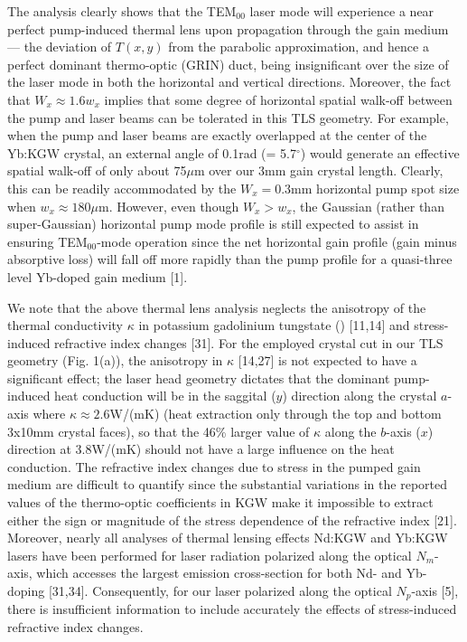
The analysis clearly shows that the TEM$_{00}$ laser mode will experience a near perfect pump-induced thermal lens upon propagation through the gain medium --- the deviation of $T(x,y)$ from the parabolic approximation, and hence a perfect dominant thermo-optic (GRIN) duct, being insignificant over the size of the laser mode in both the horizontal and vertical directions.
Moreover, the fact that $W_x \approx 1.6 w_x$ implies that some degree of horizontal spatial walk-off between the pump and laser beams can be tolerated in this TLS geometry.
For example, when the pump and laser beams are exactly overlapped at the center of the Yb:KGW crystal, an external angle of 0.1rad (= 5.7$^\circ$) would generate an effective spatial walk-off of only about 75$\mu$m over our 3mm gain crystal length.
Clearly, this can be readily accommodated by the $W_x = 0.3$mm horizontal pump spot size when $w_x \approx 180\mu$m.
However, even though $W_x > w_x$, the Gaussian (rather than super-Gaussian) horizontal pump mode profile is still expected to assist in ensuring TEM$_{00}$-mode operation since the net horizontal gain profile (gain minus absorptive loss) will fall off more rapidly than the pump profile for a quasi-three level Yb-doped gain medium [1].

We note that the above thermal lens analysis neglects the anisotropy of the thermal conductivity $\kappa$ in potassium gadolinium tungstate () [11,14] and stress-induced refractive index changes [31].
For the employed crystal cut in our TLS geometry (Fig. 1(a)), the anisotropy in $\kappa$ [14,27] is not expected to have a significant effect; the laser head geometry dictates that the dominant pump-induced heat conduction will be in the saggital ($y$) direction along the crystal $a$-axis where $\kappa \approx 2.6$W/(mK) (heat extraction only through the top and bottom 3x10mm crystal faces), so that the 46\% larger value of $\kappa$ along the $b$-axis ($x$) direction at 3.8W/(mK) should not have a large influence on the heat conduction.
The refractive index
changes due to stress in the pumped gain medium are difficult to quantify since the substantial variations in the reported values of the thermo-optic coefficients in KGW make it impossible to extract either the sign or magnitude of the stress dependence of the refractive index [21].
Moreover, nearly all analyses of thermal lensing effects Nd:KGW and Yb:KGW lasers have been performed for laser radiation polarized along the optical $N_m$-axis, which accesses the largest emission cross-section for both Nd- and Yb-doping [31,34].
Consequently, for our laser polarized along the optical $N_p$-axis [5], there is insufficient information to include accurately the effects of stress-induced refractive index changes.

